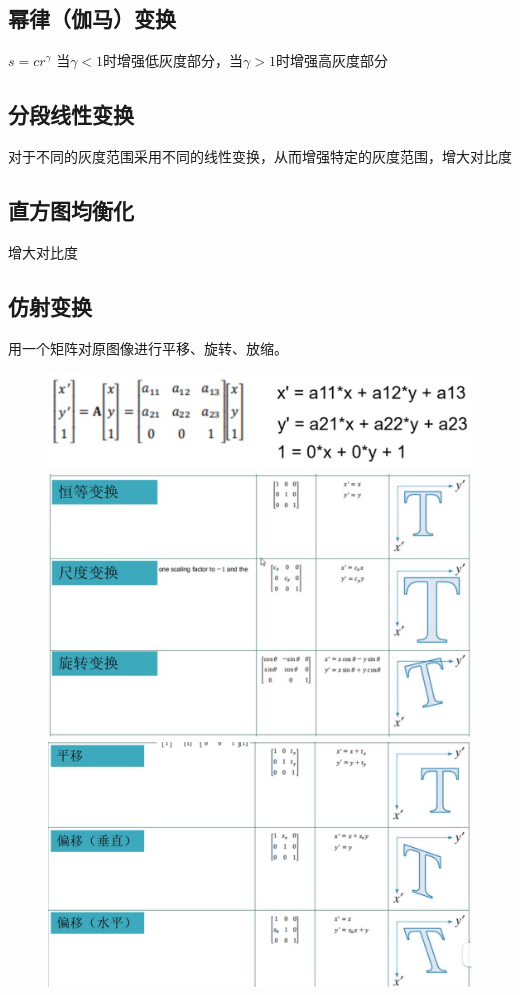 \documentclass[11pt]{article}
\begin{document}
\subsection{幂律（伽马）变换}
$s=cr^\gamma$  \qquad  当$\gamma < 1$时增强低灰度部分，当$\gamma > 1$时增强高灰度部分

\subsection{分段线性变换}
对于不同的灰度范围采用不同的线性变换，从而增强特定的灰度范围，增大对比度

\subsection{直方图均衡化}
增大对比度

\subsection{仿射变换}
用一个矩阵对原图像进行平移、旋转、放缩。
\begin{figure}[htb]
    \includegraphics[scale=0.1]{imgs/affine.png}
    \includegraphics[scale=0.1]{imgs/affine_1.png}
    \includegraphics[scale=0.1]{imgs/affine_2.png}
\end{figure}
\end{document}
